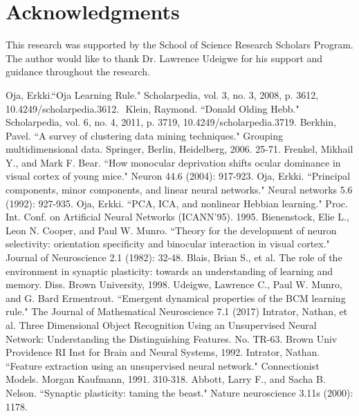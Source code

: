 \documentclass[10pt,twoside]{article}
\begin{document}
\section*{\centering Acknowledgments}
This research was supported by the School of Science Research Scholars Program.
The author would like to thank Dr. Lawrence Udeigwe for his support and guidance
throughout the research. 


\newenvironment{block}{ \item\relax}{\endlist}
\begin{block} 
\begin{thebibliography}
\noindent
\medskip
{}
Oja, Erkki.``Oja Learning Rule." Scholarpedia, vol. 3, no. 3, 2008, p. 3612, 10.4249/scholarpedia.3612.
‌ 
Klein, Raymond. ``Donald Olding Hebb." Scholarpedia, vol. 6, no. 4, 2011, p. 3719, 10.4249/scholarpedia.3719.
Berkhin, Pavel. ``A survey of clustering data mining techniques." Grouping multidimensional data. Springer, Berlin, Heidelberg, 2006. 25-71.
Frenkel, Mikhail Y., and Mark F. Bear. ``How monocular deprivation shifts ocular dominance in visual cortex of young mice." Neuron 44.6 (2004): 917-923.
Oja, Erkki. ``Principal components, minor components, and linear neural networks." Neural networks 5.6 (1992): 927-935.
Oja, Erkki. ``PCA, ICA, and nonlinear Hebbian learning." Proc. Int. Conf. on Artificial Neural Networks (ICANN’95). 1995.
Bienenstock, Elie L., Leon N. Cooper, and Paul W. Munro. ``Theory for the development of neuron selectivity: orientation specificity and binocular interaction in visual cortex." Journal of Neuroscience 2.1 (1982): 32-48.
Blais, Brian S., et al. The role of the environment in synaptic plasticity: towards an understanding of learning and memory. Diss. Brown University, 1998.
Udeigwe, Lawrence C., Paul W. Munro, and G. Bard Ermentrout. ``Emergent dynamical properties of the BCM learning rule." The Journal of Mathematical Neuroscience 7.1 (2017)
 Intrator, Nathan, et al. Three Dimensional Object Recognition Using an Unsupervised Neural Network: Understanding the Distinguishing Features. No. TR-63. Brown Univ Providence RI Inst for Brain and Neural Systems, 1992.
Intrator, Nathan. ``Feature extraction using an unsupervised neural network." Connectionist Models. Morgan Kaufmann, 1991. 310-318.
Abbott, Larry F., and Sacha B. Nelson. ``Synaptic plasticity: taming the beast." Nature neuroscience 3.11s (2000): 1178.

\end{thebibliography}
\end{block}
\end{document}
